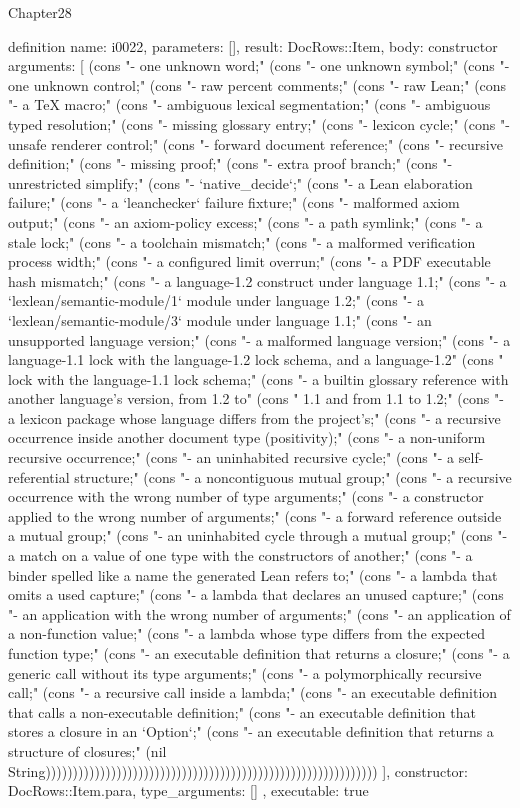 \begin{lexlean}{Chapter28}
\begin{semanticmodule}
definition{
  name: i0022,
  parameters: [],
  result: DocRows::Item,
  body: constructor{
    arguments: [
      (cons "- one unknown word;" (cons "- one unknown symbol;" (cons "- one unknown control;" (cons "- raw percent comments;" (cons "- raw Lean;" (cons "- a TeX macro;" (cons "- ambiguous lexical segmentation;" (cons "- ambiguous typed resolution;" (cons "- missing glossary entry;" (cons "- lexicon cycle;" (cons "- unsafe renderer control;" (cons "- forward document reference;" (cons "- recursive definition;" (cons "- missing proof;" (cons "- extra proof branch;" (cons "- unrestricted simplify;" (cons "- `native_decide`;" (cons "- a Lean elaboration failure;" (cons "- a `leanchecker` failure fixture;" (cons "- malformed axiom output;" (cons "- an axiom-policy excess;" (cons "- a path symlink;" (cons "- a stale lock;" (cons "- a toolchain mismatch;" (cons "- a malformed verification process width;" (cons "- a configured limit overrun;" (cons "- a PDF executable hash mismatch;" (cons "- a language-1.2 construct under language 1.1;" (cons "- a `lexlean/semantic-module/1` module under language 1.2;" (cons "- a `lexlean/semantic-module/3` module under language 1.1;" (cons "- an unsupported language version;" (cons "- a malformed language version;" (cons "- a language-1.1 lock with the language-1.2 lock schema, and a language-1.2" (cons "  lock with the language-1.1 lock schema;" (cons "- a builtin glossary reference with another language's version, from 1.2 to" (cons "  1.1 and from 1.1 to 1.2;" (cons "- a lexicon package whose language differs from the project's;" (cons "- a recursive occurrence inside another document type (positivity);" (cons "- a non-uniform recursive occurrence;" (cons "- an uninhabited recursive cycle;" (cons "- a self-referential structure;" (cons "- a noncontiguous mutual group;" (cons "- a recursive occurrence with the wrong number of type arguments;" (cons "- a constructor applied to the wrong number of arguments;" (cons "- a forward reference outside a mutual group;" (cons "- an uninhabited cycle through a mutual group;" (cons "- a match on a value of one type with the constructors of another;" (cons "- a binder spelled like a name the generated Lean refers to;" (cons "- a lambda that omits a used capture;" (cons "- a lambda that declares an unused capture;" (cons "- an application with the wrong number of arguments;" (cons "- an application of a non-function value;" (cons "- a lambda whose type differs from the expected function type;" (cons "- an executable definition that returns a closure;" (cons "- a generic call without its type arguments;" (cons "- a polymorphically recursive call;" (cons "- a recursive call inside a lambda;" (cons "- an executable definition that calls a non-executable definition;" (cons "- an executable definition that stores a closure in an `Option`;" (cons "- an executable definition that returns a structure of closures;" (nil String)))))))))))))))))))))))))))))))))))))))))))))))))))))))))))))
    ],
    constructor: DocRows::Item.para,
    type_arguments: []
  },
  executable: true
}


\end{semanticmodule}
\end{lexlean}
